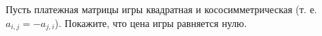 Пусть платежная матрицы игры квадратная и кососимметрическая (т. е. $a_{i, j} = -a_{j, i}$). Покажите, что цена игры
равняется нулю.
